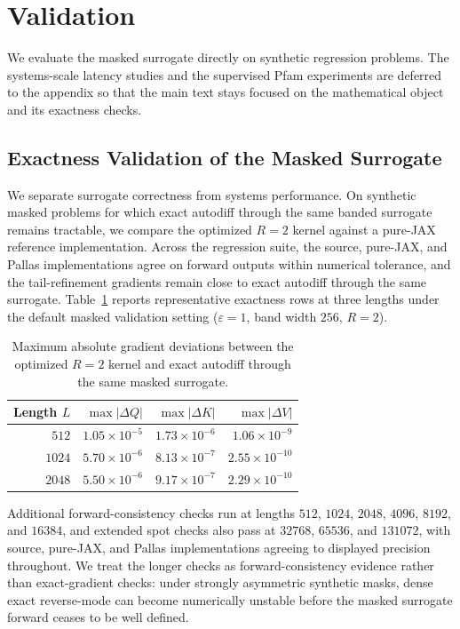 \documentclass{article}
\begin{document}
\section{Validation}

We evaluate the masked surrogate directly on synthetic regression problems. The systems-scale latency studies and the supervised Pfam experiments are deferred to the appendix so that the main text stays focused on the mathematical object and its exactness checks.

\subsection{Exactness Validation of the Masked Surrogate}

We separate surrogate correctness from systems performance. On synthetic masked problems for which exact autodiff through the same banded surrogate remains tractable, we compare the optimized $R=2$ kernel against a pure-JAX reference implementation. Across the regression suite, the source, pure-JAX, and Pallas implementations agree on forward outputs within numerical tolerance, and the tail-refinement gradients remain close to exact autodiff through the same surrogate. Table~\ref{tab:exactness} reports representative exactness rows at three lengths under the default masked validation setting ($\varepsilon=1$, band width $256$, $R=2$).
\begin{table}[h]
    \centering
    \begin{tabular}{@{}rrrr@{}}
        \toprule
        Length $L$ & $\max |\Delta Q|$ & $\max |\Delta K|$ & $\max |\Delta V|$ \\
        \midrule
        $512$ & $1.05 \times 10^{-5}$ & $1.73 \times 10^{-6}$ & $1.06 \times 10^{-9}$ \\
        $1024$ & $5.70 \times 10^{-6}$ & $8.13 \times 10^{-7}$ & $2.55 \times 10^{-10}$ \\
        $2048$ & $5.50 \times 10^{-6}$ & $9.17 \times 10^{-7}$ & $2.29 \times 10^{-10}$ \\
        \bottomrule
    \end{tabular}
    \caption{Maximum absolute gradient deviations between the optimized $R=2$ kernel and exact autodiff through the same masked surrogate.}
    \label{tab:exactness}
\end{table}
Additional forward-consistency checks run at lengths $512$, $1024$, $2048$, $4096$, $8192$, and $16384$, and extended spot checks also pass at $32768$, $65536$, and $131072$, with source, pure-JAX, and Pallas implementations agreeing to displayed precision throughout. We treat the longer checks as forward-consistency evidence rather than exact-gradient checks: under strongly asymmetric synthetic masks, dense exact reverse-mode can become numerically unstable before the masked surrogate forward ceases to be well defined.
\end{document}

